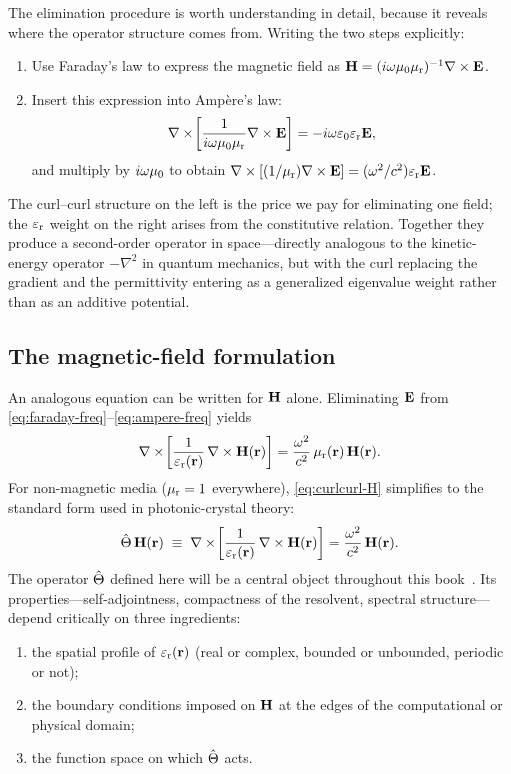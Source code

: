 The elimination procedure is worth understanding in detail, because it
reveals where the operator structure comes from. Writing the two steps
explicitly:
\begin{enumerate}
 \item Use Faraday's law to express the magnetic field as
 $\mathbf{H}=(i\omega\mu_0\mu_{\mathrm{r}})^{-1}\nabla\times\mathbf{E}$.
 \item Insert this expression into Amp\`ere's law:
 \[
 \nabla\times\!\left[\frac{1}{i\omega\mu_0\mu_{\mathrm{r}}}\nabla\times\mathbf{E}\right]
 = -i\omega\varepsilon_0\varepsilon_{\mathrm{r}}\mathbf{E},
 \]
 and multiply by $i\omega\mu_0$ to obtain
 $\nabla\times[(1/\mu_{\mathrm{r}})\nabla\times\mathbf{E}]=(\omega^2/c^2)\varepsilon_{\mathrm{r}}\mathbf{E}$.
\end{enumerate}
The curl--curl structure on the left is the price we pay for eliminating
one field; the $\varepsilon_{\mathrm{r}}$ weight on the right arises from the constitutive
relation. Together they produce a second-order operator in space---directly
analogous to the kinetic-energy operator $-\nabla^2$ in quantum mechanics,
but with the curl replacing the gradient and the permittivity entering as
a generalized eigenvalue weight rather than as an additive potential.

\subsection{The magnetic-field formulation}
\label{ssec:h-formulation}

An analogous equation can be written for $\mathbf{H}$ alone. Eliminating $\mathbf{E}$
from \eqref{eq:faraday-freq}--\eqref{eq:ampere-freq} yields
\begin{equation}
 \nabla\times\!\left[\frac{1}{\varepsilon_{\mathrm{r}}(\mathbf{r})}\,\nabla\times\mathbf{H}(\mathbf{r})\right]
 = \frac{\omega^2}{c^2}\,\mu_{\mathrm{r}}(\mathbf{r})\,\mathbf{H}(\mathbf{r}).
 \label{eq:curlcurl-H}
\end{equation}
For non-magnetic media ($\mu_{\mathrm{r}} = 1$ everywhere), \eqref{eq:curlcurl-H}
simplifies to the standard form used in photonic-crystal theory:
\begin{equation}
 \hat{\Theta}\,\mathbf{H}(\mathbf{r})
 \;\equiv\;
 \nabla\times\!\left[\frac{1}{\varepsilon_{\mathrm{r}}(\mathbf{r})}\,\nabla\times\mathbf{H}(\mathbf{r})\right]
 = \frac{\omega^2}{c^2}\,\mathbf{H}(\mathbf{r}).
 \label{eq:maxwell-op-H}
\end{equation}
The operator $\hat{\Theta}$ defined here will be a central object throughout
this book~\cite{figotin2004hamiltonian,raman2010photonic}. Its properties---self-adjointness, compactness of the resolvent,
spectral structure---depend critically on three ingredients:
\begin{enumerate}
 \item the spatial profile of $\varepsilon_{\mathrm{r}}(\mathbf{r})$ (real or complex, bounded or
 unbounded, periodic or not);
 \item the boundary conditions imposed on $\mathbf{H}$ at the edges of the
 computational or physical domain;
 \item the function space on which $\hat{\Theta}$ acts.
\end{enumerate}

